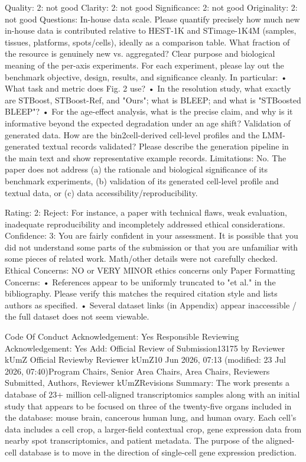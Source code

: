 Quality: 2: not good
Clarity: 2: not good
Significance: 2: not good
Originality: 2: not good
Questions:
In-house data scale. Please quantify precisely how much new in-house data is contributed relative to HEST-1K and STimage-1K4M (samples, tissues, platforms, spots/cells), ideally as a comparison table. What fraction of the resource is genuinely new vs. aggregated? 
Clear purpose and biological meaning of the per-axis experiments. For each experiment, please lay out the benchmark objective, design, results, and significance cleanly. In particular: • What task and metric does Fig. 2 use? • In the resolution study, what exactly are STBoost, STBoost-Ref, and "Ours"; what is BLEEP; and what is "STBoosted BLEEP"? • For the age-effect analysis, what is the precise claim, and why is it informative beyond the expected degradation under an age shift?
Validation of generated data. How are the bin2cell-derived cell-level profiles and the LMM-generated textual records validated? Please describe the generation pipeline in the main text and show representative example records.
Limitations:
No. The paper does not address (a) the rationale and biological significance of its benchmark experiments, (b) validation of its generated cell-level profile and textual data, or (c) data accessibility/reproducibility.

Rating: 2: Reject: For instance, a paper with technical flaws, weak evaluation, inadequate reproducibility and incompletely addressed ethical considerations.
Confidence: 3: You are fairly confident in your assessment. It is possible that you did not understand some parts of the submission or that you are unfamiliar with some pieces of related work. Math/other details were not carefully checked.
Ethical Concerns: NO or VERY MINOR ethics concerns only
Paper Formatting Concerns:
• References appear to be uniformly truncated to "et al." in the bibliography. Please verify this matches the required citation style and lists authors as specified. • Several dataset links (in Appendix) appear inaccessible / the full dataset does not seem viewable.

Code Of Conduct Acknowledgement: Yes
Responsible Reviewing Acknowledgement: Yes
Add:
Official Review of Submission13175 by Reviewer kUmZ
Official Reviewby Reviewer kUmZ10 Jun 2026, 07:13 (modified: 23 Jul 2026, 07:40)Program Chairs, Senior Area Chairs, Area Chairs, Reviewers Submitted, Authors, Reviewer kUmZRevisions
Summary:
The work presents a database of 23+ million cell-aligned transcriptomics samples along with an initial study that appears to be focused on three of the twenty-five organs included in the database: mouse brain, cancerous human lung, and human ovary. Each cell's data includes a cell crop, a larger-field contextual crop, gene expression data from nearby spot transcriptomics, and patient metadata. The purpose of the aligned-cell database is to move in the direction of single-cell gene expression prediction.

